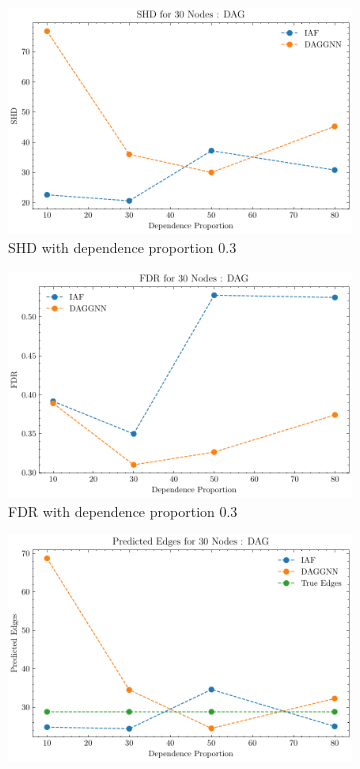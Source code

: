 \documentclass[10pt]{article}
\begin{document}
\begin{figure}
    \centering
    \begin{subfigure}{0.45\textwidth}
        \includegraphics[width=\textwidth]{fig/SHD_dependence_30_DAG_threshold0.3.pdf}
        \caption{SHD with dependence proportion 0.3}
        \label{SHD_prop30}
    \end{subfigure}
    \hfill
    \begin{subfigure}{0.45\textwidth}
        \includegraphics[width=\textwidth]{fig/FDR_dependence_30_DAG_threshold0.3.pdf}
        \caption{FDR with dependence proportion 0.3}
        \label{FDR_prop30}
    \end{subfigure}
    \begin{subfigure}{0.45\textwidth}
        \includegraphics[width=\textwidth]{fig/Predicted Edges_dependence_30_DAG_threshold0.3.pdf}

\end{subfigure}
\end{figure}
\end{document}
